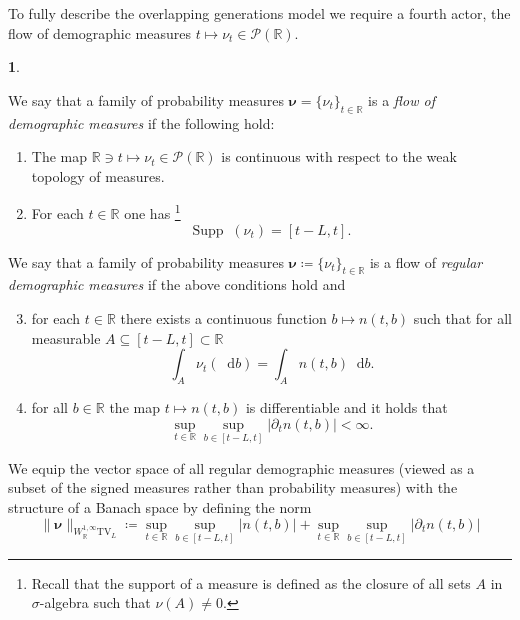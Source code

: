 \documentclass[11pt,oneside,english,reqno,dvipsnames,table]{amsart}
\numberwithin{equation}{section}
\theoremstyle{plain}
\theoremstyle{definition}
\newtheorem{defn}[thm]{\protect\definitionname}
\theoremstyle{remark}
\theoremstyle{plain}
\theoremstyle{plain}
\theoremstyle{plain}
\theoremstyle{plain}
\theoremstyle{plain}
\theoremstyle{plain}
\theoremstyle{plain}
\providecommand{\definitionname}{Definition}
\newcommand{\TV}{\text{TV}}
\newcommand{\dd}{\mathop{}\!\mathrm{d}}
\newcommand{\mcP}{\mathcal{P}}
\newcommand{\mbR}{\mathbb{R}}
\newcommand{\bnu}{\boldsymbol{\nu}}
\numberwithin{thm}{section}
\newcommand{\supp}{\text{Supp}\mathop{}\!}
\begin{document}
To fully describe the overlapping generations model we require a fourth actor, the flow of demographic measures $t\mapsto \nu_t \in \mcP(\mbR)$.
%
\begin{defn}\label{def:dem_flow}

    We say that a family of probability measures $\bnu = \{\nu_t\}_{t\in \mbR}$ is a \emph{flow of demographic measures} if the following hold:
    \begin{enumerate}[label=\roman*)]
        \item The map $\mbR \ni t\mapsto \nu_t \in \mcP(\mbR)$ is continuous with respect to the weak topology of measures.
        \item For each $t\in \mbR$ one has \footnote{Recall that the support of a measure is defined as the closure of all sets $A$ in $\sigma$-algebra such that $\nu(A)\neq 0$.
        }
        \begin{equation*}
            \supp(\nu_t) = [t-L,t].
        \end{equation*}
    \end{enumerate}
    We say that a family of probability measures $\bnu \coloneqq \{\nu_t\}_{t\in \mbR}$ is a flow of \emph{regular demographic measures} if the above conditions hold and
    \begin{enumerate}[label=\roman*)]
    \setcounter{enumi}{2}
        \item for each $t\in \mbR$ there exists a continuous function $b\mapsto n(t,b)$ such that for all measurable $A\subseteq [t-L,t]\subset \mbR$
        \begin{equation*}
            \int_A \nu_t(\dd b) = \int_A  n(t,b)\dd b.
        \end{equation*}
\item for all $b\in \mbR$ the map $t\mapsto n(t,b)$ is differentiable and it holds that
%
\begin{equation*}
    \sup_{t\in \mbR}\sup_{b\in [t-L,t]} |\partial_t n(t,b)|  <\infty.
\end{equation*}
    \end{enumerate}
    We equip the vector space of all regular demographic measures (viewed as a subset of the signed measures rather than probability measures) with the structure of a Banach space by defining the norm 
    \begin{equation}\label{eq:demography_norm}
        \|\bnu\|_{W^{1,\infty}_{\mbR} \TV_L } \coloneqq \sup_{t\in \mbR} \sup_{b\in [t-L,t]} |n(t,b)| + \sup_{t\in \mbR} \sup_{b\in [t-L,t]} |\partial_t n(t,b)|
    \end{equation}
\end{defn}
\end{document}
